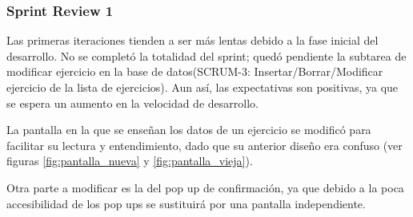 \subsubsection{Sprint Review 1}
Las primeras iteraciones tienden a ser más lentas debido a la fase inicial del desarrollo. No se completó la totalidad del sprint; quedó pendiente la subtarea de modificar ejercicio en la base de datos(SCRUM-3: Insertar/Borrar/Modificar ejercicio de la lista de ejercicios). Aun así, las expectativas son positivas, ya que se espera un aumento en la velocidad de desarrollo.

La pantalla en la que se enseñan los datos de un ejercicio se modificó para facilitar su lectura y entendimiento, dado que su anterior diseño era confuso (ver figuras \cref{fig:pantalla_nueva} y \cref{fig:pantalla_vieja}).

Otra parte a modificar es la del pop up de confirmación, ya que debido a la poca accesibilidad de los pop ups se sustituirá por una pantalla independiente.

